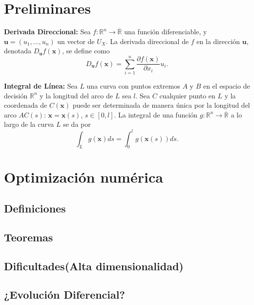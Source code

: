 
\chapter{Preliminares}

\textbf{Derivada Direccional:} Sea \( f : \mathbb{R}^n \to \overline{\mathbb{R}} \) una función diferenciable, y \( \mathbf{u} = (u_1, \ldots, u_n) \) un vector de \( U_X \). La derivada direccional de \( f \) en la dirección \( \mathbf{u} \), denotada \( D_{\mathbf{u}} f(\mathbf{x}) \), se define como
\[
D_{\mathbf{u}} f(\mathbf{x}) = \sum_{i=1}^{n} \frac{\partial f(\mathbf{x})}{\partial x_i} u_i.
\]

\textbf{Integral de Línea:} Sea \( L \) una curva con puntos extremos \( A \) y \( B \) en el espacio de decisión \( \mathbb{R}^n \) y la longitud del arco de \( L \) sea \( l \). Sea \( C \) cualquier punto en \( L \) y la coordenada de \( C (\mathbf{x}) \) puede ser determinada de manera única por la longitud del arco \( AC (s) \): \( \mathbf{x} = \mathbf{x}(s) \), \( s \in [0, l] \). La integral de una función \( g : \mathbb{R}^n \to \overline{\mathbb{R}} \) a lo largo de la curva \( L \) se da por
\begin{equation}
\int_L g(\mathbf{x}) ds = \int_0^l g(\mathbf{x}(s)) ds.
\label{EQ0}
\end{equation}

\chapter{Optimización numérica}

\section{Definiciones}

\section{Teoremas}

\section{Dificultades(Alta dimensionalidad)}

\section{¿Evolución Diferencial?}

\endinput
